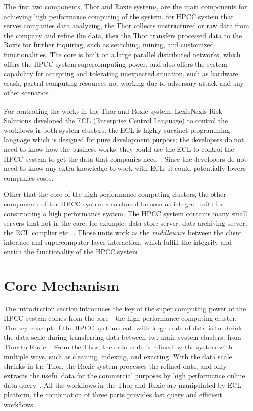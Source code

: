 The first two components, Thor and Roxie systems, are the main components for achieving high performance computing of the system. for HPCC system that serves companies data analyzing, the Thor collects unstructured or raw data from the company and refine the data, then the Thor transfers processed data to the Roxie for further inquiring, such as searching, mining, and customized functionalities. The core is built on a large parallel distributed networks, which offers the HPCC system supercomputing power, and also offers the system capability for accepting and tolerating unexpected situation, such as hardware crash, partial computing resources not working due to adversary attack and any other scenarios~\cite{Intro4}.

For controlling the works in the Thor and Roxie system, LexisNexis\textsuperscript{\textregistered} Risk Solutions developed the ECL (Enterprise Control Language) to control the workflows in both system clusters. the ECL is highly succinct programming language which is designed for pure development purpose; the developers do not need to know how the business works, they could use the ECL to control the HPCC system to get the data that companies need~\cite{ECL}. Since the developers do not need to know any extra knowledge to work with ECL, it could potentially lowers companies costs.

Other that the core of the high performance computing clusters, the other components of the HPCC system also should be seen as integral units for constructing a high performance system. The HPCC system contains many small servers that not in the core, for example: data store server, data archiving server, the ECL complier etc.~\cite{Intro4}. Those units work as the \textit{middleware} between the client interface and supercomputer layer interaction, which fulfill the integrity and enrich the functionality of the HPCC system~\cite{Intro5}. 

\section{Core Mechanism}
The introduction section introduces the key of the super computing power of the HPCC system comes from the core - the high performance computing cluster. The key concept of the HPCC system deals with large scale of data is to shrink the data scale during transferring data between two main system clusters: from Thor to Roxie~\cite{CM1}. From the Thor, the data scale is refined by the system with multiple ways, such as cleaning, indexing, and exacting. With the data scale shrinks in the Thor, the Roxie system processes the refined data, and only extracts the useful data for the commercial purposes by high performance online data query~\cite{Intro3}. All the workflows in the Thor and Roxie are manipulated by ECL platform, the combination of three parts provides fast query and efficient workflows.

